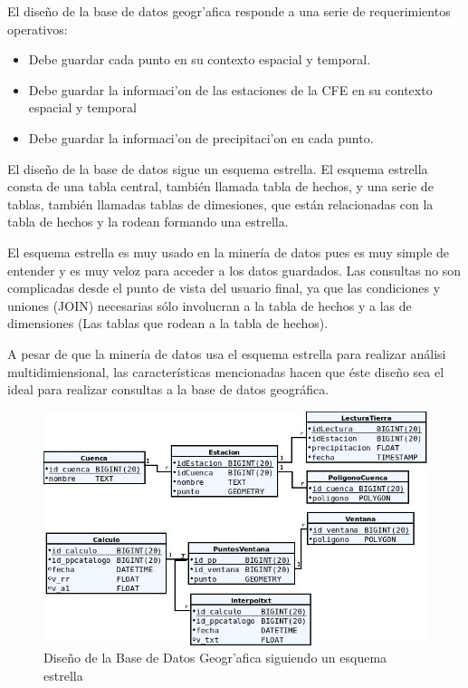 El dise\~no de la base de datos geogr'afica responde a una serie de requerimientos operativos:
\begin{itemize}
 \item Debe guardar cada punto en su contexto espacial y temporal.
 \item Debe guardar la informaci'on de las estaciones de la CFE en su contexto espacial y temporal
 \item Debe guardar la informaci'on de precipitaci'on en cada punto.
\end{itemize}
El dise\~no de la base de datos sigue un esquema estrella\cite{starsqueme}. El esquema estrella consta de una tabla central, tambi\'en 
llamada tabla de hechos, y una serie de tablas, tambi\'en llamadas tablas de dimesiones, que est\'an relacionadas con la tabla de hechos y la rodean 
formando una estrella. 

El esquema estrella es muy usado en la miner\'ia de datos pues es muy simple de entender y es muy veloz para acceder a los datos guardados. 
Las consultas no son complicadas desde el punto de vista del usuario final, ya que las condiciones y uniones (JOIN) necesarias s\'olo 
involucran a la tabla de hechos y a las de dimensiones (Las tablas que rodean a la tabla de hechos).

A pesar de que la miner\'ia de datos usa el esquema estrella para realizar an\'alisi multidimiensional, las caracter\'isticas mencionadas 
hacen que \'este dise\~no sea el ideal para realizar consultas a la base de datos geogr\'afica. 


\begin{figure}[h!]
 \centering
 \includegraphics[width=150mm]{./imagenes/DataBase.jpg}
 \caption{Dise\~no de la Base de Datos Geogr'afica siguiendo un esquema estrella}
\end{figure}


